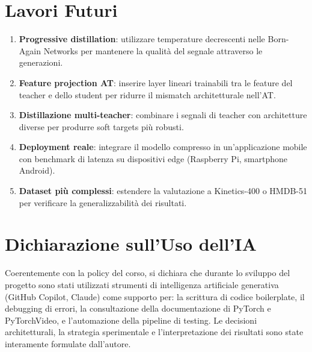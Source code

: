 \section{Lavori Futuri}

\begin{enumerate}
    \item \textbf{Progressive distillation}: utilizzare temperature decrescenti nelle Born-Again Networks per mantenere la qualità del segnale attraverso le generazioni.
    \item \textbf{Feature projection AT}: inserire layer lineari trainabili tra le feature del teacher e dello student per ridurre il mismatch architetturale nell'AT.
    \item \textbf{Distillazione multi-teacher}: combinare i segnali di teacher con architetture diverse per produrre soft targets più robusti.
    \item \textbf{Deployment reale}: integrare il modello compresso in un'applicazione mobile con benchmark di latenza su dispositivi edge (Raspberry Pi, smartphone Android).
    \item \textbf{Dataset più complessi}: estendere la valutazione a Kinetics-400 o HMDB-51 per verificare la generalizzabilità dei risultati.
\end{enumerate}

\section{Dichiarazione sull'Uso dell'IA}

Coerentemente con la policy del corso, si dichiara che durante lo sviluppo del progetto sono stati utilizzati strumenti di intelligenza artificiale generativa (GitHub Copilot, Claude) come supporto per: la scrittura di codice boilerplate, il debugging di errori, la consultazione della documentazione di PyTorch e PyTorchVideo, e l'automazione della pipeline di testing. Le decisioni architetturali, la strategia sperimentale e l'interpretazione dei risultati sono state interamente formulate dall'autore.
